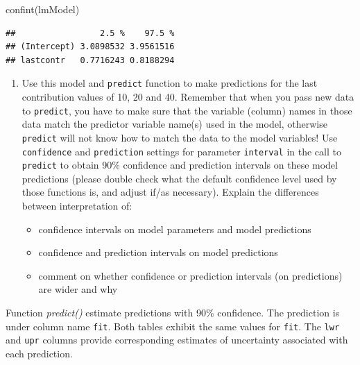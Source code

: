 \documentclass[
]{article}
\newenvironment{Shaded}{\begin{snugshade}}{\end{snugshade}}
\newcommand{\FunctionTok}[1]{\textcolor[rgb]{0.00,0.00,0.00}{#1}}
\newcommand{\NormalTok}[1]{#1}
\providecommand{\tightlist}{%
  \setlength{\itemsep}{0pt}\setlength{\parskip}{0pt}}
\begin{document}
\begin{Shaded}
\begin{Highlighting}[]
\FunctionTok{confint}\NormalTok{(lmModel)}
\end{Highlighting}
\end{Shaded}

\begin{verbatim}
##                 2.5 %    97.5 %
## (Intercept) 3.0898532 3.9561516
## lastcontr   0.7716243 0.8188294
\end{verbatim}

\begin{enumerate}
\def\labelenumi{\arabic{enumi}.}
\setcounter{enumi}{5}
\tightlist
\item
  Use this model and \texttt{predict} function to make predictions for
  the last contribution values of 10, 20 and 40. Remember that when you
  pass new data to \texttt{predict}, you have to make sure that the
  variable (column) names in those data match the predictor variable
  name(s) used in the model, otherwise \texttt{predict} will not know
  how to match the data to the model variables! Use \texttt{confidence}
  and \texttt{prediction} settings for parameter \texttt{interval} in
  the call to \texttt{predict} to obtain 90\% confidence and prediction
  intervals on these model predictions (please double check what the
  default confidence level used by those functions is, and adjust if/as
  necessary). Explain the differences between interpretation of:

  \begin{itemize}
  \tightlist
  \item
    confidence intervals on model parameters and model predictions
  \item
    confidence and prediction intervals on model predictions
  \item
    comment on whether confidence or prediction intervals (on
    predictions) are wider and why
  \end{itemize}
\end{enumerate}

Function \emph{predict()} estimate predictions with 90\% confidence. The
prediction is under column name \texttt{fit}. Both tables exhibit the
same values for \texttt{fit}. The \texttt{lwr} and \texttt{upr} columns
provide corresponding estimates of uncertainty associated with each
prediction.
\end{document}
